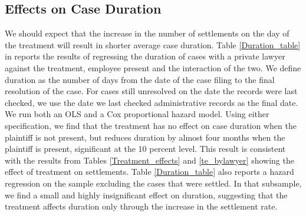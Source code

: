 \documentclass[11pt, a4paper]{article}
\begin{document}

\subsection{Effects on Case Duration}

We should expect that the increase in the number of settlements on the day of the treatment will result in shorter average case duration. Table \ref{Duration_table} in  reports the results of regressing the duration of cases with a private lawyer against the treatment, employee present and the interaction of the two. We define duration as the number of days from the date of the case filing to the final resolution of the case. For cases still unresolved on the date the records were last checked, we use the date we last checked administrative records as the final date. We run both an OLS and a Cox proportional hazard model. Using either specification, we find that the treatment has no effect on case duration when the plaintiff is not present, but reduces duration by almost four months when the plaintiff is present, significant at the 10 percent level. This result is consistent with the results from Tables \ref{Treatment_effects} and \ref{te_bylawyer} showing the effect of treatment on settlements. Table \ref{Duration_table} also reports a hazard regression on the sample excluding the cases that were settled. In that subsample, we find a small and highly insignificant effect on duration, suggesting that the treatment affects duration only through the increase in the settlement rate.
\end{document}
